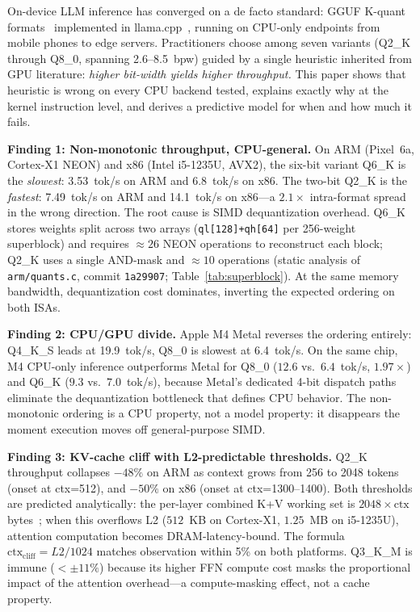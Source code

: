 \documentclass[conference]{IEEEtran}
\begin{document}
On-device LLM inference has converged on a de facto standard: GGUF K-quant
formats~\cite{gguf} implemented in llama.cpp~\cite{llamacpp}, running on
CPU-only endpoints from mobile phones to edge servers.
Practitioners choose among seven variants (Q2\_K through Q8\_0, spanning
2.6--8.5~bpw) guided by a single heuristic inherited from GPU literature:
\emph{higher bit-width yields higher throughput.}
This paper shows that heuristic is wrong on every CPU backend tested, explains
exactly why at the kernel instruction level, and derives a predictive model
for when and how much it fails.

\textbf{Finding 1: Non-monotonic throughput, CPU-general.}
On ARM (Pixel~6a, Cortex-X1 NEON) and x86 (Intel i5-1235U, AVX2), the
six-bit variant Q6\_K is the \emph{slowest}: 3.53~tok/s on ARM and 6.8~tok/s
on x86. The two-bit Q2\_K is the \emph{fastest}: 7.49~tok/s on ARM and
14.1~tok/s on x86---a $2.1\times$ intra-format spread in the wrong direction.
The root cause is SIMD dequantization overhead.
Q6\_K stores weights split across two arrays (\texttt{ql[128]+qh[64]} per
256-weight superblock) and requires ${\approx}26$ NEON operations to reconstruct
each block; Q2\_K uses a single AND-mask and ${\approx}10$ operations
(static analysis of \texttt{arm/quants.c}, commit \texttt{1a29907}; Table~\ref{tab:superblock}).
At the same memory bandwidth, dequantization cost dominates, inverting the
expected ordering on both ISAs.

\textbf{Finding 2: CPU/GPU divide.}
Apple M4 Metal reverses the ordering entirely: Q4\_K\_S leads at
19.9~tok/s, Q8\_0 is slowest at 6.4~tok/s.
On the same chip, M4 CPU-only inference outperforms Metal for Q8\_0
($12.6$ vs.\ $6.4$~tok/s, $1.97\times$) and Q6\_K ($9.3$ vs.\ $7.0$~tok/s),
because Metal's dedicated 4-bit dispatch paths eliminate the dequantization
bottleneck that defines CPU behavior.
The non-monotonic ordering is a CPU property, not a model property: it
disappears the moment execution moves off general-purpose SIMD.

\textbf{Finding 3: KV-cache cliff with L2-predictable thresholds.}
Q2\_K throughput collapses $-48\%$ on ARM as context grows from 256 to 2048
tokens (onset at ctx=512), and $-50\%$ on x86 (onset at ctx=1300--1400).
Both thresholds are predicted analytically: the per-layer combined K+V
working set is $2048\times\text{ctx}$ bytes~\cite{llama32,gqa}; when this
overflows L2 ($512$~KB on Cortex-X1, $1.25$~MB on i5-1235U), attention
computation becomes DRAM-latency-bound.
The formula $\text{ctx}_\text{cliff}=L2/1024$ matches observation within 5\%
on both platforms. Q3\_K\_M is immune ($<\pm11\%$) because its higher FFN
compute cost masks the proportional impact of the attention overhead---a
compute-masking effect, not a cache property.
\end{document}
